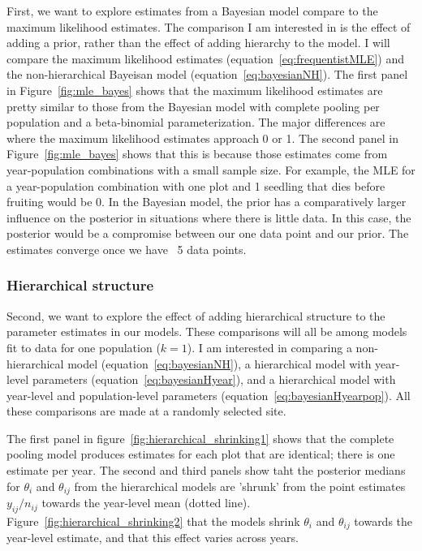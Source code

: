 \documentclass[12pt, oneside, titlepage]{article}   	%
\begin{document}
First, we want to explore estimates from a Bayesian model compare to the maximum likelihood estimates. The comparison I am interested in is the effect of adding a prior, rather than the effect of adding hierarchy to the model. I will compare the maximum likelihood estimates (equation~\eqref{eq:frequentistMLE}) and the non-hierarchical Bayeisan model (equation~\eqref{eq:bayesianNH}). The first panel in Figure~\ref{fig:mle_bayes} shows that the maximum likelihood estimates are pretty similar to those from the Bayesian model with complete pooling per population and a beta-binomial parameterization. The major differences are where the maximum likelihood estimates approach 0 or 1. The second panel in Figure~\ref{fig:mle_bayes} shows that this is because those estimates come from year-population combinations with a small sample size. For example, the MLE for a year-population combination with one plot and 1 seedling that dies before fruiting would be 0. In the Bayesian model, the prior has a comparatively larger influence on the posterior in situations where there is little data. In this case, the posterior would be a compromise between our one data point and our prior. The estimates converge once we have ~5 data points.

\subsubsection*{Hierarchical structure}

Second, we want to explore the effect of adding hierarchical structure to the parameter estimates in our models. These comparisons will all be among models fit to data for one population ($k=1$). I am interested in comparing a non-hierarchical model (equation~\eqref{eq:bayesianNH}), a hierarchical model with year-level parameters (equation~\eqref{eq:bayesianHyear}), and a hierarchical model with year-level and population-level parameters (equation~\eqref{eq:bayesianHyearpop}). All these comparisons are made at a randomly selected site. 

The first panel in figure~\ref{fig:hierarchical_shrinking1} shows that the complete pooling model produces estimates for each plot that are identical; there is one estimate per year. The second and third panels show taht the posterior medians for $\theta_i$ and $\theta_{ij}$ from the hierarchical models are 'shrunk' from the point estimates $y_{ij}/n_{ij}$ towards the year-level mean (dotted line). Figure~\ref{fig:hierarchical_shrinking2} that the models shrink $\theta_i$ and $\theta_{ij}$ towards the year-level estimate, and that this effect varies across years. 
\end{document}
